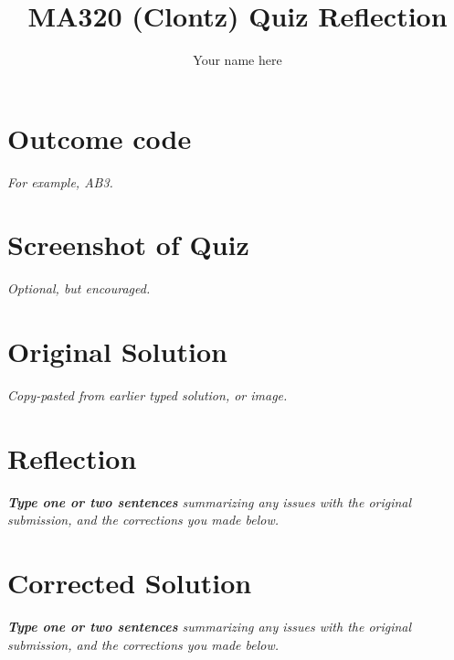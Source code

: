 \documentclass{article}
\title{MA320 (Clontz) Quiz Reflection}
\author{Your name here}
\begin{document}
\maketitle

\section{Outcome code}
\textit{For example, AB3.}





\section{Screenshot of Quiz}
\textit{Optional, but encouraged.}





\section{Original Solution}
\textit{Copy-pasted from earlier typed solution, or image.}









\section{Reflection}
\textit{\textbf{Type one or two sentences} summarizing any issues with the
original submission, and the corrections you made below.}








\section{Corrected Solution}
\textit{\textbf{Type one or two sentences} summarizing any issues with the
original submission, and the corrections you made below.}

\end{document}
